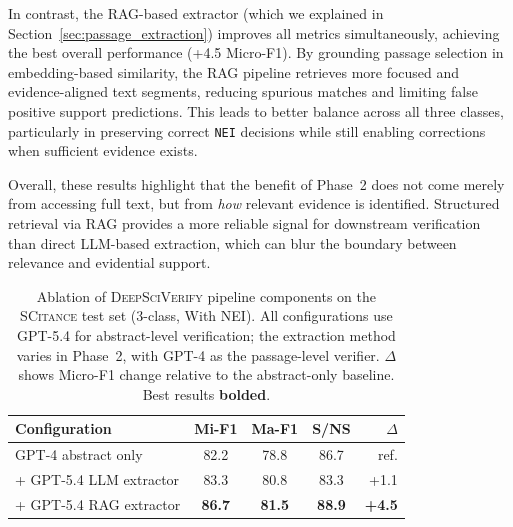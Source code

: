 \documentclass{article}
\theoremstyle{plain}
\theoremstyle{definition}
\theoremstyle{remark}
\begin{document}
In contrast, the RAG-based extractor (which we explained in Section~\ref{sec:passage_extraction}) improves all metrics simultaneously, achieving the best overall performance (+4.5 Micro-F1). By grounding passage selection in embedding-based similarity, the RAG pipeline retrieves more focused and evidence-aligned text segments, reducing spurious matches and limiting false positive support predictions. This leads to better balance across all three classes, particularly in preserving correct \texttt{NEI} decisions while still enabling corrections when sufficient evidence exists.

Overall, these results highlight that the benefit of Phase~2 does not come merely from accessing full text, but from \emph{how} relevant evidence is identified. Structured retrieval via RAG provides a more reliable signal for downstream verification than direct LLM-based extraction, which can blur the boundary between relevance and evidential support.

\begin{table}[t]
\centering
\small
\caption{Ablation of \textsc{DeepSciVerify} pipeline components on the \textsc{SCitance} test set
  (3-class, With NEI). All configurations use GPT-5.4 for abstract-level verification; the extraction method varies in Phase~2, with GPT-4 as the passage-level verifier. $\Delta$ shows Micro-F1 change relative to the abstract-only baseline.
  Best results \textbf{bolded}.}
\label{tab:ablation}
\begin{tabularx}{\columnwidth}{@{} X ccc r @{}}
\toprule
\textbf{Configuration}
  & \textbf{Mi-F1} & \textbf{Ma-F1} & \textbf{S/NS}
  & \textbf{$\Delta$} \\
\midrule
GPT-4 abstract only
  & 82.2 & 78.8 & 86.7 & ref. \\
\addlinespace[2pt]
+ GPT-5.4 LLM extractor
  & 83.3 & 80.8 & 83.3
  & \textcolor{green!50!black}{+1.1} \\
\addlinespace[2pt]
\rowcolor{green!12}+ GPT-5.4 RAG extractor
  & \textbf{86.7} & \textbf{81.5} & \textbf{88.9}
  & \textcolor{green!50!black}{\textbf{+4.5}} \\
\bottomrule
\end{tabularx}
\end{table}


\end{document}
